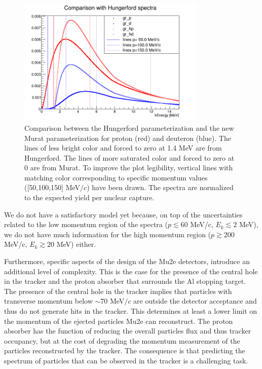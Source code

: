 \documentclass[12pt,a4paper,openright, oneside, titlepage]{book} %
\begin{document}
\begin{figure}[h!]
\centering
\includegraphics[width =0.8\textwidth, keepaspectratio]{new_spectra_2/comparison2}
\caption[Comparison of spectrum parameteerizations]{Comparison \cite{io:comparison} between the Hungerford parameterization \cite{Hungerford} 
and the new Murat parameterization \cite{Pasha:spectra} for proton (red) and deuteron (blue). 
The lines of less bright color and forced to zero at 1.4 MeV are from Hungerford.
 The lines of more saturated color and forced to zero at 0 are from Murat.
To improve the plot legibility, 
vertical lines with matching color corresponding to specific momentum values ([50,100,150] MeV$/c$) have been drawn. The spectra are normalized to the expected yield per nuclear capture.}
\label{_comparison2}
\end{figure}

\noindent 
We do not have a satisfactory model yet because, 
on top of the uncertainties related to the low momentum region of the spectra
($p \lesssim 60$ MeV/c, $E_k \lesssim 2$ MeV), 
we do not have much information for the high momentum region 
($p\gtrsim200$ MeV/c, $E_k\gtrsim 20$ MeV) either.

\noindent
Furthermore, specific aspects of the design of the Mu2e detectors, introduce an additional level of complexity. 
This is the case for the presence of the central hole in the tracker and the proton absorber that surrounds the Al stopping target.
The presence of the central hole in the tracker implies that particles with transverse momentum below $\sim70$ MeV$/c$ are outside the detector acceptance and thus do not generate hits in the tracker. 
This determines at least a lower limit on the momentum of the ejected particles Mu2e can reconstruct. 
The proton absorber has the function of reducing the overall particles flux and thus tracker occupancy, but at the cost of degrading the momentum measurement of the particles reconstructed by the tracker. 
The consequence is that predicting the spectrum of particles that can be observed in the tracker is a challenging task.
\end{document}
